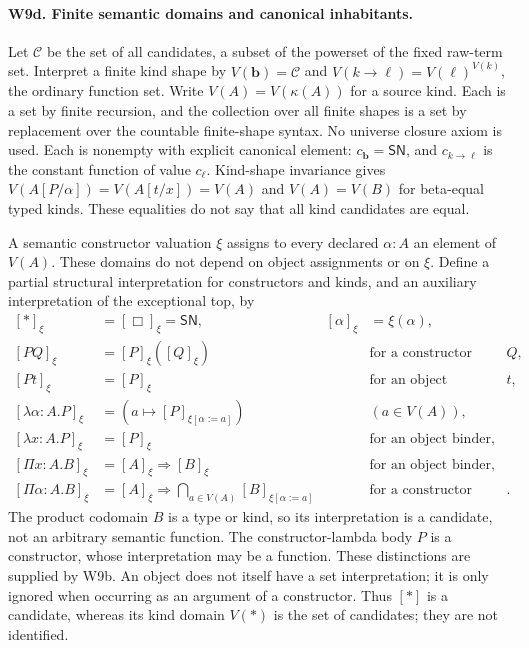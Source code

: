 \paragraph{W9d. Finite semantic domains and canonical inhabitants.}
Let \(\mathcal C\) be the set of all candidates, a subset of the
powerset of the fixed raw-term set. Interpret a finite kind shape by
\(V(\mathbf b)=\mathcal C\) and
\(V(k\to\ell)=V(\ell)^{V(k)}\), the ordinary function set.
Write \(V(A)=V(\kappa(A))\) for a source kind. Each is a set by
finite recursion, and the collection over all finite shapes is a set
by replacement over the countable finite-shape syntax. No universe
closure axiom is used. Each is nonempty with explicit canonical element:
\(c_{\mathbf b}=\mathsf{SN}\), and
\(c_{k\to\ell}\) is the constant function of value \(c_\ell\).
Kind-shape invariance gives \(V(A[P/\alpha])=V(A[t/x])=V(A)\)
and \(V(A)=V(B)\) for beta-equal typed kinds. These equalities do not
say that all kind candidates are equal.

A semantic constructor valuation \(\xi\) assigns to every declared
\(\alpha:A\) an element of \(V(A)\). These domains do not depend
on object assignments or on \(\xi\). Define a partial structural
interpretation for constructors and kinds, and an auxiliary interpretation
of the exceptional top, by
\[
\begin{aligned}
 [\ast]_\xi&=[\Box]_\xi=\mathsf{SN},&
 [\alpha]_\xi&=\xi(\alpha),\\
 [PQ]_\xi&=[P]_\xi([Q]_\xi)&&\text{for a constructor argument }Q,\\
 [Pt]_\xi&=[P]_\xi&&\text{for an object argument }t,\\
 [\lambda\alpha:A.P]_\xi&=(a\mapsto[P]_{\xi[\alpha:=a]})
      &&(a\in V(A)),\\
 [\lambda x:A.P]_\xi&=[P]_\xi&&\text{for an object binder},\\
 [\Pi x:A.B]_\xi&=[A]_\xi\Rightarrow[B]_\xi
      &&\text{for an object binder},\\
 [\Pi\alpha:A.B]_\xi&=[A]_\xi\Rightarrow
           \bigcap_{a\in V(A)}[B]_{\xi[\alpha:=a]}
      &&\text{for a constructor binder}.
\end{aligned}
\]
The product codomain \(B\) is a type or kind, so its interpretation is
a candidate, not an arbitrary semantic function. The constructor-lambda
body \(P\) is a constructor, whose interpretation may be a function.
These distinctions are supplied by W9b. An object does not itself have
a set interpretation; it is only ignored when occurring as an argument
of a constructor. Thus \([\ast]\) is a candidate, whereas its kind
domain \(V(\ast)\) is the set of candidates; they are not identified.

